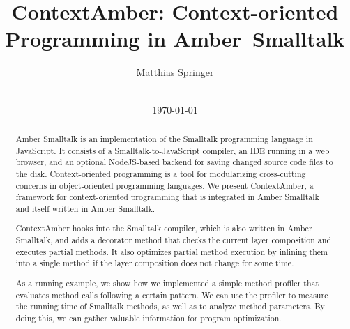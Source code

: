 \documentclass{sig-alternate}
\begin{document}
%

\title{ContextAmber: Context-oriented Programming in Amber~Smalltalk}

\author{
\alignauthor
Matthias Springer\\
       \\
}

\date{\today}

\maketitle
\begin{abstract}
Amber Smalltalk is an implementation of the Smalltalk programming language in JavaScript. It consists of a Smalltalk-to-JavaScript compiler, an IDE running in a web browser, and an optional NodeJS-based backend for saving changed source code files to the disk. Context-oriented programming is a tool for modularizing cross-cutting concerns in object-oriented programming languages. We present ContextAmber, a framework for context-oriented programming that is integrated in Amber Smalltalk and itself written in Amber Smalltalk.

ContextAmber hooks into the Smalltalk compiler, which is also written in Amber Smalltalk, and adds a decorator method that checks the current layer composition and executes partial methods. It also optimizes partial method execution by inlining them into a single method if the layer composition does not change for some time.

As a running example, we show how we implemented a simple method profiler that evaluates method calls following a certain pattern. We can use the profiler to measure the running time of Smalltalk methods, as well as to analyze method parameters. By doing this, we can gather valuable information for program optimization.
\end{abstract}
\end{document}
